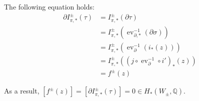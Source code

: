 The following equation holds:
\begin{align*}
    \partial I_{\pi,*}^\pm(\tau) &= I_{\pi,*}^\pm(\partial \tau)\\
    &= I_{\pi, *}^\pm(\operatorname{ev}_{\partial, *}^{-1}(\partial \sigma))\\
    &= I_{\pi, *}^\pm(\operatorname{ev}_\partial^{-1}(i_*(z)))\\
    &= I_{\pi, *}^\pm\left((j \circ \operatorname{ev}_\partial^{-1} \circ i')_*(z)\right)\\
    &= f^\pm(z)
\end{align*}

As a result, $\left[f^\pm(z)\right] = \left[\partial I_{\pi,*}^\pm(\tau)\right] = 0 \in H_*(W_\pm, \mathbb Q)$.
